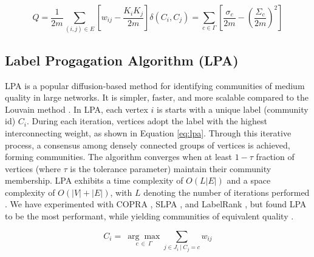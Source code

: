 \begin{equation}
\label{eq:modularity}
  Q
  = \frac{1}{2m} \sum_{(i, j) \in E} \left[w_{ij} - \frac{K_i K_j}{2m}\right] \delta(C_i, C_j)
  = \sum_{c \in \Gamma} \left[\frac{\sigma_c}{2m} - \left(\frac{\Sigma_c}{2m}\right)^2\right]
\end{equation}





\subsection{Label Progagation Algorithm (LPA)}
\label{sec:about-rak}

LPA \cite{com-raghavan07} is a popular diffusion-based method for identifying communities of medium quality in large networks. It is simpler, faster, and more scalable compared to the Louvain method \cite{com-blondel08}. In LPA, each vertex $i$ is starts with a unique label (community id) $C_i$. During each iteration, vertices adopt the label with the highest interconnecting weight, as shown in Equation \ref{eq:lpa}. Through this iterative process, a consensus among densely connected groups of vertices is achieved, forming communities. The algorithm converges when at least $1-\tau$ fraction of vertices (where $\tau$ is the tolerance parameter) maintain their community membership. LPA exhibits a time complexity of $O(L |E|)$ and a space complexity of $O(|V| + |E|)$, with $L$ denoting the number of iterations performed \cite{com-raghavan07}. We have experimented with COPRA \cite{com-gregory10}, SLPA \cite{com-xie11}, and LabelRank \cite{com-xie13}, but found LPA to be the most performant, while yielding communities of equivalent quality \cite{sahu2023selecting}.

\begin{equation}
\label{eq:lpa}
  C_i =\ \underset{c\ \in \ \Gamma}{\arg\max} { \sum_{j \in J_i\ |\ C_j = c} w_{ij} }
\end{equation}
